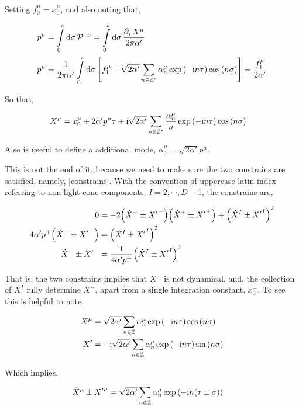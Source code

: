 Setting $f_0^\mu=x_0^\mu$, and also noting that,

\begin{align*}
    p^\mu&=\int\limits_0^\pi\dd{\sigma}\mathcal P^{\tau\mu}=\int\limits_0^\pi\dd{\sigma}\frac{\partial_\tau X^\mu}{2\pi\alpha'}\\
    p^\mu&=\frac{1}{2\pi\alpha'}\int\limits_0^\pi\dd{\sigma}\qty[f_1^\mu+\sqrt{2\alpha'}\sum\limits_{n\in\mathbb Z^\ast}\alpha_n^\mu\exp\qty(-\textnormal{i} n\tau)\cos\qty(n\sigma)]=\frac{f_1^\mu}{2\alpha'}   
\end{align*}

So that,

\begin{align*}
    X^\mu&=x_0^\mu+2\alpha' p^\mu\tau+\textnormal{i}\sqrt{2\alpha'}\sum\limits_{n\in\mathbb Z^\ast}\frac{\alpha_n^\mu}{n}\exp\qty(-\textnormal{i} n\tau)\cos\qty(n\sigma)   
\end{align*}

Also is useful to define a additional mode, $\alpha_0^\mu=\sqrt{2\alpha'}p^\mu$. 

This is not the end of it, because we need to make sure the two constrains are satisfied, namely, \ref{constrains}. With the convention of 
uppercase latin index referring to non-light-cone components, $I=2,\cdots,D-1$, the constrains are,

\begin{align*}
    0&=-2\qty({\dot X}^-\pm{X'}^-)\qty({\dot X}^+\pm{X'}^+)+\qty({\dot X}^I\pm{X'}^I)^2\\
    4\alpha'p^+\qty({\dot X}^-\pm{X'}^-)&=\qty({\dot X}^I\pm{X'}^I)^2\\
    {\dot X}^-\pm{X'}^-&=\frac{1}{4\alpha'p^+}\qty({\dot X}^I\pm{X'}^I)^2
\end{align*}

That is, the two constrains implies that $X^-$ is not dynamical, and, the collection of $X^I$ fully determine $X^-$, 
apart from a single integration constant, $x_0^-$. To see this is helpful to note,

\begin{align*}
    {\dot X}^\mu&=\sqrt{2\alpha'}\sum\limits_{n\in\mathbb Z}\alpha_n^\mu\exp\qty(-\textnormal{i} n\tau)\cos\qty(n\sigma)\\
    {X'}&=-\textnormal{i}\sqrt{2\alpha'}\sum\limits_{n\in\mathbb Z}\alpha_n^\mu\exp\qty(-\textnormal{i} n\tau)\sin\qty(n\sigma)
\end{align*}

Which implies,

\begin{align*}
    {\dot X}^\mu\pm{X'}^\mu&=\sqrt{2\alpha'}\sum\limits_{n\in\mathbb Z}\alpha_n^\mu\exp\qty(-\textnormal{i} n\qty(\tau\pm \sigma))
\end{align*}

